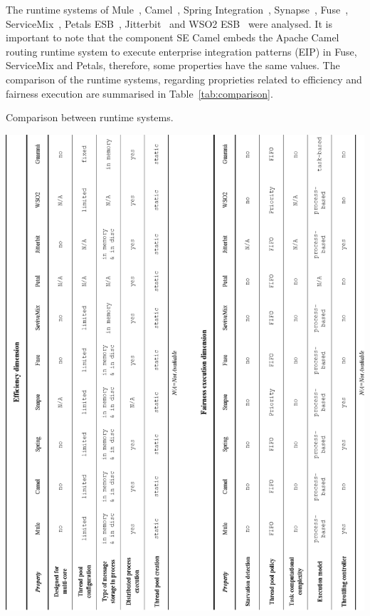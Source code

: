 The runtime systems of Mule~\cite{dossot2014}, Camel~\cite{isen2010}, Spring Integration~\cite{fisher2012}, Synapse~\cite{rademakers2008,jayasinghe2011}, Fuse~\cite{russell2012}, ServiceMix~\cite{konsek2013}, Petals ESB~\cite{surhone2010}, Jitterbit~\cite{russell2012_1} and WSO2 ESB~\cite{indrasiri2016} were analysed. It is important to note that the component SE Camel embeds the Apache Camel routing runtime system to execute enterprise integration patterns (EIP) in Fuse, ServiceMix and Petals, therefore, some properties have the same values. The comparison of the runtime systems, regarding proprieties related to efficiency and fairness execution are summarised in Table~\ref{tab:comparison}.
\begin{table}[htbp]
	\centering
	\caption{Comparison between runtime systems.}
    \includegraphics[scale=0.8]{./figs/table_dimensionsv.eps}
	\label{tab:comparison}
\end{table}

